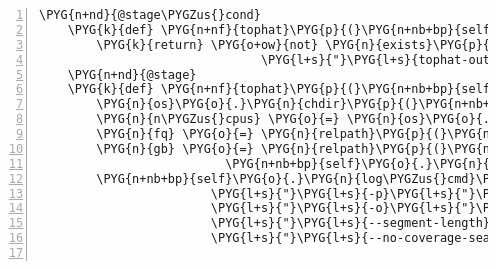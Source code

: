 \begin{Verbatim}[commandchars=\\\{\},numbers=left,firstnumber=1,stepnumber=5]
    \PYG{n+nd}{@stage\PYGZus{}cond}
    \PYG{k}{def} \PYG{n+nf}{tophat}\PYG{p}{(}\PYG{n+nb+bp}{self}\PYG{p}{)}\PYG{p}{:}
        \PYG{k}{return} \PYG{o+ow}{not} \PYG{n}{exists}\PYG{p}{(}\PYG{n}{join}\PYG{p}{(}\PYG{n+nb+bp}{self}\PYG{o}{.}\PYG{n}{analysis}\PYG{o}{.}\PYG{n}{data\PYGZus{}dir}\PYG{p}{,}
                               \PYG{l+s}{"}\PYG{l+s}{tophat-output}\PYG{l+s}{"}\PYG{p}{,} \PYG{l+s}{"}\PYG{l+s}{accepted\PYGZus{}hits.bam}\PYG{l+s}{"}\PYG{p}{)}\PYG{p}{)}
    \PYG{n+nd}{@stage}
    \PYG{k}{def} \PYG{n+nf}{tophat}\PYG{p}{(}\PYG{n+nb+bp}{self}\PYG{p}{)}\PYG{p}{:}
        \PYG{n}{os}\PYG{o}{.}\PYG{n}{chdir}\PYG{p}{(}\PYG{n+nb+bp}{self}\PYG{o}{.}\PYG{n}{analysis}\PYG{o}{.}\PYG{n}{data\PYGZus{}dir}\PYG{p}{)}
        \PYG{n}{n\PYGZus{}cpus} \PYG{o}{=} \PYG{n}{os}\PYG{o}{.}\PYG{n}{sysconf}\PYG{p}{(}\PYG{l+s}{"}\PYG{l+s}{SC\PYGZus{}NPROCESSORS\PYGZus{}ONLN}\PYG{l+s}{"}\PYG{p}{)}
        \PYG{n}{fq} \PYG{o}{=} \PYG{n}{relpath}\PYG{p}{(}\PYG{n+nb+bp}{self}\PYG{o}{.}\PYG{n}{analysis}\PYG{o}{.}\PYG{n}{inputfile\PYGZus{}fq\PYGZus{}path}\PYG{p}{)}
        \PYG{n}{gb} \PYG{o}{=} \PYG{n}{relpath}\PYG{p}{(}\PYG{n}{join}\PYG{p}{(}\PYG{n+nb+bp}{self}\PYG{o}{.}\PYG{n}{analysis}\PYG{o}{.}\PYG{n}{genbank\PYGZus{}data\PYGZus{}dir}\PYG{p}{,}
                          \PYG{n+nb+bp}{self}\PYG{o}{.}\PYG{n}{analysis}\PYG{o}{.}\PYG{n}{genbankfile\PYGZus{}base\PYGZus{}name}\PYG{p}{)}\PYG{p}{)}
        \PYG{n+nb+bp}{self}\PYG{o}{.}\PYG{n}{log\PYGZus{}cmd}\PYG{p}{(}\PYG{l+s}{"}\PYG{l+s}{tophat}\PYG{l+s}{"}\PYG{p}{,}
                        \PYG{l+s}{"}\PYG{l+s}{-p}\PYG{l+s}{"}\PYG{p}{,} \PYG{n+nb}{str}\PYG{p}{(}\PYG{n}{n\PYGZus{}cpus}\PYG{p}{)}\PYG{p}{,}
                        \PYG{l+s}{"}\PYG{l+s}{-o}\PYG{l+s}{"}\PYG{p}{,} \PYG{l+s}{"}\PYG{l+s}{tophat-output}\PYG{l+s}{"}\PYG{p}{,}
                        \PYG{l+s}{"}\PYG{l+s}{--segment-length}\PYG{l+s}{"}\PYG{p}{,} \PYG{l+s}{"}\PYG{l+s}{999999999}\PYG{l+s}{"}\PYG{p}{,}
                        \PYG{l+s}{"}\PYG{l+s}{--no-coverage-search}\PYG{l+s}{"}\PYG{p}{,} \PYG{l+s}{"}\PYG{l+s}{--no-novel-juncs}\PYG{l+s}{"}\PYG{p}{,} \PYG{n}{gb}\PYG{p}{,} \PYG{n}{fq}\PYG{p}{)}


\end{Verbatim}
